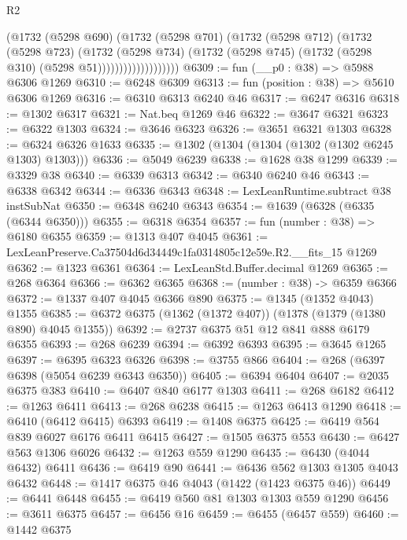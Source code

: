 \begin{lexlean}{R2}
\begin{coremodule}
                          (@1732
                            (@5298 @690)
                            (@1732
                              (@5298 @701)
                              (@1732
                                (@5298 @712)
                                (@1732
                                  (@5298 @723)
                                  (@1732
                                    (@5298 @734)
                                    (@1732
                                      (@5298 @745)
                                      (@1732 (@5298 @310) (@5298 @51)))))))))))))))))))
@6309 := fun (__p0 : @38) => @5988 @6306 @1269
@6310 := @6248 @6309
@6313 := fun (position : @38) => @5610 @6306 @1269
@6316 := @6310 @6313 @6240 @46
@6317 := @6247 @6316
@6318 := @1302 @6317
@6321 := Nat.beq @1269 @46
@6322 := @3647 @6321
@6323 := @6322 @1303
@6324 := @3646 @6323
@6326 := @3651 @6321 @1303
@6328 := @6324 @6326 @1633
@6335 := @1302 (@1304 (@1304 (@1302 (@1302 @6245 @1303) @1303)))
@6336 := @5049 @6239
@6338 := @1628 @38 @1299
@6339 := @3329 @38
@6340 := @6339 @6313
@6342 := @6340 @6240 @46
@6343 := @6338 @6342
@6344 := @6336 @6343
@6348 := LexLeanRuntime.subtract @38 instSubNat
@6350 := @6348 @6240 @6343
@6354 := @1639 (@6328 (@6335 (@6344 @6350)))
@6355 := @6318 @6354
@6357 := fun (number : @38) => @6180 @6355
@6359 := @1313 @407 @4045
@6361 := LexLeanPreserve.Ca37504d6d34449c1fa0314805c12e59e.R2.__fits_15 @1269
@6362 := @1323 @6361
@6364 := LexLeanStd.Buffer.decimal @1269
@6365 := @268 @6364
@6366 := @6362 @6365
@6368 := (number : @38) -> @6359 @6366
@6372 := @1337 @407 @4045 @6366 @890
@6375 := @1345 (@1352 @4043) @1355
@6385 := @6372 @6375 (@1362 (@1372 @407)) (@1378 (@1379 (@1380 @890) @4045 @1355))
@6392 := @2737 @6375 @51 @12 @841 @888 @6179 @6355
@6393 := @268 @6239
@6394 := @6392 @6393
@6395 := @3645 @1265
@6397 := @6395 @6323 @6326
@6398 := @3755 @866
@6404 := @268 (@6397 @6398 (@5054 @6239 @6343 @6350))
@6405 := @6394 @6404
@6407 := @2035 @6375 @383
@6410 := @6407 @840 @6177 @1303
@6411 := @268 @6182
@6412 := @1263 @6411
@6413 := @268 @6238
@6415 := @1263 @6413 @1290
@6418 := @6410 (@6412 @6415) @6393
@6419 := @1408 @6375
@6425 := @6419 @564 @839 @6027 @6176 @6411 @6415
@6427 := @1505 @6375 @553
@6430 := @6427 @563 @1306 @6026
@6432 := @1263 @559 @1290
@6435 := @6430 (@4044 @6432) @6411
@6436 := @6419 @90
@6441 := @6436 @562 @1303 @1305 @4043 @6432
@6448 := @1417 @6375 @46 @4043 (@1422 (@1423 @6375 @46))
@6449 := @6441 @6448
@6455 := @6419 @560 @81 @1303 @1303 @559 @1290
@6456 := @3611 @6375
@6457 := @6456 @16
@6459 := @6455 (@6457 @559)
@6460 := @1442 @6375

\end{coremodule}
\end{lexlean}
